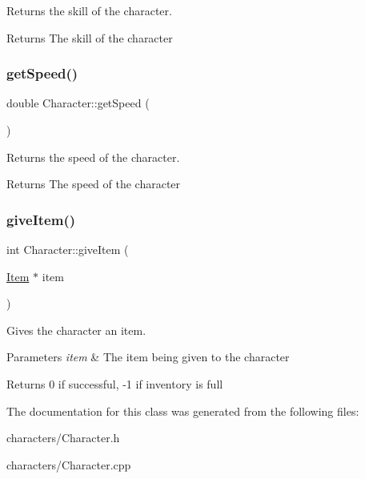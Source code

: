 Returns the skill of the character. 

\begin{DoxyReturn}{Returns}
The skill of the character 
\end{DoxyReturn}
\mbox{\label{class_character_a8e0bfcc02cbf60b5f466b4e8daa9ab8c}} 
\subsubsection{\texorpdfstring{getSpeed()}{getSpeed()}}
{\footnotesize\ttfamily double Character\+::get\+Speed (\begin{DoxyParamCaption}{ }\end{DoxyParamCaption})}



Returns the speed of the character. 

\begin{DoxyReturn}{Returns}
The speed of the character 
\end{DoxyReturn}
\mbox{\label{class_character_a88d219c54c93f65ead5a66545c7ebf87}} 
\subsubsection{\texorpdfstring{giveItem()}{giveItem()}}
{\footnotesize\ttfamily int Character\+::give\+Item (\begin{DoxyParamCaption}\item[{\mbox{\hyperlink{class_item}{Item}} $\ast$}]{item }\end{DoxyParamCaption})}



Gives the character an item. 


\begin{DoxyParams}{Parameters}
{\em item} & The item being given to the character \\
\hline
\end{DoxyParams}
\begin{DoxyReturn}{Returns}
0 if successful, -\/1 if inventory is full 
\end{DoxyReturn}


The documentation for this class was generated from the following files\+:\begin{DoxyCompactItemize}
\item 
characters/Character.\+h\item 
characters/Character.\+cpp\end{DoxyCompactItemize}
